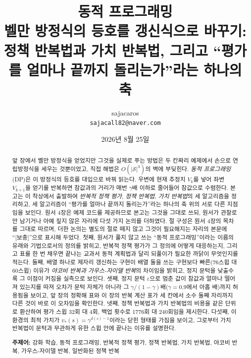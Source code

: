 \documentclass[11pt,a4paper]{article}
\title{\bfseries 동적 프로그래밍\\[2mm]
\large 벨만 방정식의 등호를 갱신식으로 바꾸기: 정책 반복법과 가치 반복법,
그리고 ``평가를 얼마나 끝까지 돌리는가''라는 하나의 축}
\author{sajacaros\\\small \texttt{sajacall82@naver.com}}
\date{2026년 8월 25일}
\newcommand{\Sset}{\mathcal{S}}
\begin{document}
\maketitle

\begin{abstract}
\noindent
앞 장에서 벨만 방정식을 얻었지만 그것을 실제로 푸는 방법은 두 칸짜리 예제에서 손으로 연립방정식을
세우는 것뿐이었고, 직접 해법은 $O(|\Sset|^3)$의 벽에 부딪힌다. \emph{동적 프로그래밍}(DP)은 이 방정식의
등호를 대입으로 바꿔 읽는다. 우변에 현재 추정치 $V_k$를 넣어 좌변 $V_{k+1}$을 얻기를 반복하면 참값과의
거리가 매번 $\gamma$배 이하로 줄어들어 참값으로 수렴한다.
본고는 이 착상에서 출발하여 \emph{반복적 정책 평가}, \emph{정책 반복법}, \emph{가치 반복법}의 세
알고리즘을 정리하고, 세 알고리즘이 ``평가를 얼마나 끝까지 돌리는가''라는 하나의 축 위의 서로 다른
지점임을 보인다.
원서\cite{dlfs4} 4장은 예제 코드를 제공하므로 본고는 그것을 그대로 쓰되, 원서가 관찰로만 남기거나 아예
짚지 않은 자리에 다섯 가지 논의를 더하였다. 절 구성은 원서 4장의 목차를 그대로 따르며, 더한 논의는
별도의 절로 떼지 않고 그것이 필요해지는 자리의 본문에 ``[보충]''으로 표시해 두었다.
첫째, 원서가 풀지 않고 쓰는 ``동적 프로그래밍''이라는 이름의 유래와 기법으로서의 정의를 밝히고,
반복적 정책 평가가 그 정의에 어떻게 대응하는지, 그리고 표를 한 번 채우면 끝나는 교과서 동적 계획법과
달리 되풀이가 필요한 까닭이 무엇인지를 적는다.
둘째, 배열 하나로 제자리 갱신하는 구현이 배열 둘을 쓰는 구현보다 빠른(76스윕 대 60스윕) 이유가
\emph{야코비 반복과 가우스-자이델 반복}의 차이임을 밝히고, 정지 문턱을 낮출수록 그 이점이 커짐을
실측으로 보인다.
셋째, 정지 문턱 $\varepsilon$으로 멈춘 값이 참값과 얼마나 떨어져 있는지를 따져 오차가 문턱 자체가
아니라 그 $\gamma/(1-\gamma)$배($\gamma=0.9$에서 아홉 배)까지 허용됨을 보이고, 앞 장의 정확해 표와
이 장의 반복 계산 표가 세 칸에서 소수 둘째 자리까지 다른 것이 바로 이 오차임을 확인한다.
넷째, 정책 반복법과 가치 반복법의 비용을 같은 단위로 환산하여 평가 스윕 32회 대 4회, 백업 횟수로
1776회 대 240회임을 제시한다.
다섯째, 이 환경의 최적 가치가 $v_*(s)=\gamma^{d(s)-1}$이라는 닫힌 형태를 가짐을 보이고, 그로부터 가치
반복법이 문턱과 무관하게 유한 스윕 안에 끝나는 이유를 설명한다.

\vspace{2mm}
\noindent\textbf{주제어:} 강화 학습, 동적 프로그래밍, 반복적 정책 평가, 정책 반복법, 가치 반복법,
야코비 반복, 가우스-자이델 반복, 일반화된 정책 반복
\end{abstract}

\tableofcontents
\vspace{4mm}
\end{document}
